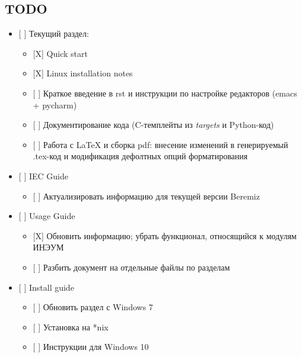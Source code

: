 \documentclass[letterpaper,10pt,russian]{sphinxmanual}
\begin{document}
\subsection{TODO}
\label{documentation_guide/todo_pages:todo}\label{documentation_guide/todo_pages::doc}\begin{itemize}
\item {} 
{[} {]} Текущий раздел:
\begin{itemize}
\item {} 
{[}X{]} Quick start

\item {} 
{[}X{]} Linux installation notes

\item {} 
{[} {]} Краткое введение в rst и инструкции по настройке редакторов (emacs + pycharm)

\item {} 
{[} {]} Документирование кода (C-темплейты из \emph{targets} и Python-код)

\item {} 
{[} {]} Работа с LaTeX и сборка pdf: внесение изменений в генерируемый .tex-код и модификация дефолтных опций форматирования

\end{itemize}

\item {} 
{[} {]} IEC Guide
\begin{itemize}
\item {} 
{[} {]} Актуализировать информацию для текущей версии Beremiz

\end{itemize}

\item {} 
{[} {]} Usage Guide
\begin{itemize}
\item {} 
{[}X{]} Обновить информацию; убрать функционал, относящийся к модулям ИНЭУМ

\item {} 
{[} {]} Разбить документ на отдельные файлы по разделам

\end{itemize}

\item {} 
{[} {]} Install guide
\begin{itemize}
\item {} 
{[} {]} Обновить раздел с Windows 7

\item {} 
{[} {]} Установка на *nix

\item {} 
{[} {]} Инструкции для Windows 10

\end{itemize}

\end{itemize}



\renewcommand{\indexname}{Алфавитный указатель}
\printindex
\end{document}
